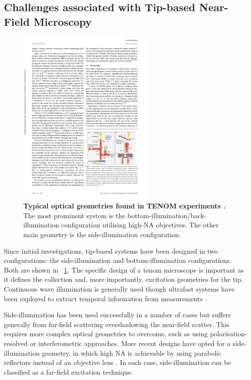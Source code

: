 \documentclass{article}
\begin{document}
\subsection{Challenges associated with Tip-based Near-Field Microscopy}

\begin{figure}[bt]
\centering
\includegraphics[width=0.6\textwidth]{figures/literature/mauser2014a}
\caption[Typical optical geometries found in TENOM experiments \cite{mauser2014}]{\textbf{Typical optical geometries found in TENOM experiments \cite{mauser2014}.} The most prominent system is the bottom-illumination/back-illumination configuration utilising high-NA objectives. The other main geometry is the side-illumination configuration.}
\label{fig:ters_geometries}
\end{figure}

Since initial investigations, tip-based systems have been designed in two configurations: the side-illumination and bottom-illumination configurations. Both are shown in \figurename~\ref{fig:ters_geometries}. The specific design of a \gls{tenom} microscope is important as it defines the collection and, more importantly, excitation geometries for the tip. Continuous wave illumination is generally used though ultrafast systems have been exployed to extract temporal information from measurements \cite{klingsporn2013}.

Side-illumination has been used successfully in a number of cases \cite{mehtani2006, zhang2013, wickramasinghe2014} but suffers generally from far-field scattering overshadowing the near-field scatter. This requires more complex optical geometries to overcome, such as using polarisation-resolved or interferometric approaches. More recent designs have opted for a side-illumination geometry, in which high NA is achievable by using parabolic reflectors instead of an objective lens \cite{steidtner2007}. In each case, side-illumination can be classified as a far-field excitation technique.
\end{document}
